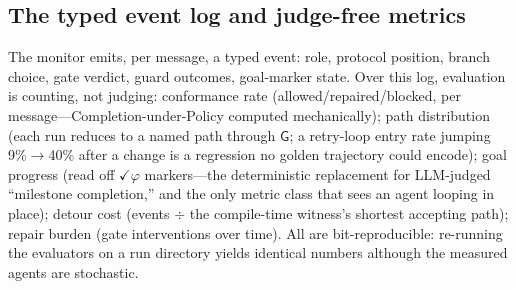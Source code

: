 \documentclass{article}
\newcommand{\gtG}{\mathsf{G}}
\begin{document}
\subsection{The typed event log and judge-free metrics}\label{sec:log}
The monitor emits, per message, a typed event: role, protocol position, branch choice, gate verdict, guard outcomes, goal-marker state. Over this log, evaluation is counting, not judging: conformance rate (allowed/repaired/blocked, per message---Completion-under-Policy computed mechanically); path distribution (each run reduces to a named path through $\gtG$; a retry-loop entry rate jumping 9\%$\to$40\% after a change is a regression no golden trajectory could encode); goal progress (read off $\checkmark\varphi$ markers---the deterministic replacement for LLM-judged ``milestone completion,'' and the only metric class that sees an agent looping in place); detour cost (events $\div$ the compile-time witness's shortest accepting path); repair burden (gate interventions over time). All are bit-reproducible: re-running the evaluators on a run directory yields identical numbers although the measured agents are stochastic.
\end{document}
